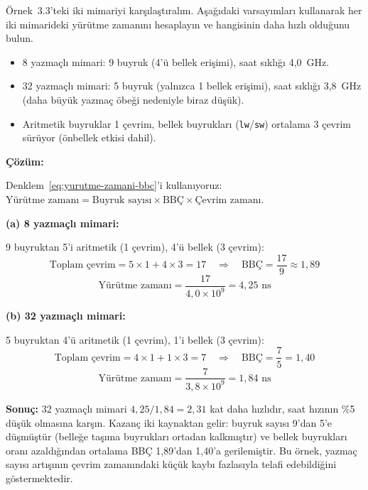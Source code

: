 \begin{ornek}[3.4]
\label{orn:yazmac-basarim}
Örnek~3.3'teki iki mimariyi karşılaştıralım. Aşağıdaki varsayımları kullanarak her iki mimarideki yürütme zamanını hesaplayın ve hangisinin daha hızlı olduğunu bulun.

\begin{itemize}[nosep]
\item 8 yazmaçlı mimari: 9 buyruk (4'ü bellek erişimi), saat sıklığı 4{,}0~GHz.
\item 32 yazmaçlı mimari: 5 buyruk (yalnızca 1 bellek erişimi), saat sıklığı 3{,}8~GHz (daha büyük yazmaç öbeği nedeniyle biraz düşük).
\item Aritmetik buyruklar 1 çevrim, bellek buyrukları (\texttt{lw}/\texttt{sw}) ortalama 3 çevrim sürüyor (önbellek etkisi dahil).
\end{itemize}

\textbf{Çözüm:}

Denklem~\ref{eq:yurutme-zamani-bbc}'i kullanıyoruz: $\text{Yürütme zamanı} = \text{Buyruk sayısı} \times \text{BBÇ} \times \text{Çevrim zamanı}$.

\medskip
\textbf{(a) 8 yazmaçlı mimari:}

9 buyruktan 5'i aritmetik (1 çevrim), 4'ü bellek (3 çevrim):
\[
\text{Toplam çevrim} = 5 \times 1 + 4 \times 3 = 17 \quad\Rightarrow\quad \text{BBÇ} = \frac{17}{9} \approx 1{,}89
\]
\[
\text{Yürütme zamanı} = \frac{17}{4{,}0 \times 10^{9}} = 4{,}25 \text{ ns}
\]

\textbf{(b) 32 yazmaçlı mimari:}

5 buyruktan 4'ü aritmetik (1 çevrim), 1'i bellek (3 çevrim):
\[
\text{Toplam çevrim} = 4 \times 1 + 1 \times 3 = 7 \quad\Rightarrow\quad \text{BBÇ} = \frac{7}{5} = 1{,}40
\]
\[
\text{Yürütme zamanı} = \frac{7}{3{,}8 \times 10^{9}} = 1{,}84 \text{ ns}
\]

\textbf{Sonuç:} 32 yazmaçlı mimari $4{,}25 / 1{,}84 = 2{,}31$ kat daha hızlıdır, saat hızının \%5 düşük olmasına karşın. Kazanç iki kaynaktan gelir: buyruk sayısı 9'dan 5'e düşmüştür (belleğe taşıma buyrukları ortadan kalkmıştır) ve bellek buyrukları oranı azaldığından ortalama BBÇ 1{,}89'dan 1{,}40'a gerilemiştir. Bu örnek, yazmaç sayısı artışının çevrim zamanındaki küçük kaybı fazlasıyla telafi edebildiğini göstermektedir.
\end{ornek}

